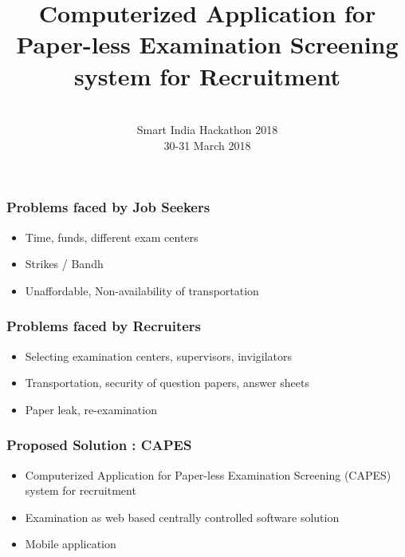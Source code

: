 \documentclass[17pt]{beamer}
\begin{document}
\sffamily \bfseries
 \title
[ \hspace{2 cm} CAPES ]
{Computerized Application for Paper-less Examination Screening system for Recruitment}
\author
[  Team NAAVU \hspace{1.5 cm} ]
{%
\small 
      \\ Smart India Hackathon 2018
      \\
{\small 30-31 March 2018} \\[0.4cm]
}
\begin{frame}
\titlepage
\end{frame}

\begin{frame}
\frametitle{Problems faced by Job Seekers} \pause
\begin{itemize}[<+-|alert@+>]
\item Time, funds, different exam centers
\item Strikes / Bandh
\item Unaffordable, Non-availability of transportation
\end{itemize}
\end{frame}

\begin{frame}
\frametitle{Problems faced by Recruiters} \pause
\begin{itemize}[<+-|alert@+>]
\item Selecting examination centers, supervisors, invigilators
\item Transportation, security of question papers, answer sheets
\item Paper leak, re-examination
\end{itemize}
\end{frame}

\begin{frame}
\frametitle{Proposed Solution : CAPES} \pause
\begin{itemize}[<+-|alert@+>]
\item Computerized Application for Paper-less Examination Screening (CAPES) system for recruitment
\item Examination as web based centrally controlled software solution
\item Mobile application
\end{itemize}
\end{frame}
\end{document}
